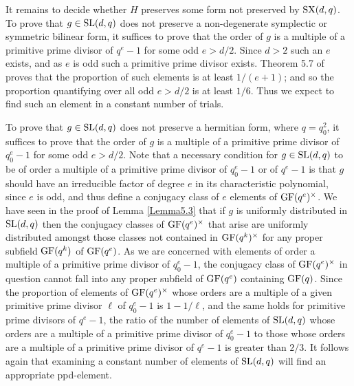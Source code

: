 \documentclass[12pt]{article}
\def\SL{{\rm SL}}
\def\GF{{\rm GF}}
\def\SX{{\rm SX}}
\begin{document}
It remains to decide whether $H$ preserves some form not preserved 
by $\SX(d,q)$.  
To prove that $g\in \SL(d,q)$ does not preserve a non-degenerate symplectic or
symmetric bilinear form, it suffices to prove that the order of $g$ is a multiple
of a primitive prime divisor of $q^e-1$ for some odd $e>d/2$.  Since $d>2$ such an
$e$ exists, and as $e$ is odd such a primitive prime divisor exists.  
Theorem 5.7 of \cite{NP} proves that 
the proportion of such elements is at least $1/(e+1)$; and so the
proportion quantifying over all odd $e>d/2$ is at least $1/6$. 
Thus we expect to find such an element in a constant number of trials.

To prove that $g\in\SL(d,q)$ does not preserve a hermitian form, where $q=q_0^2$, it
suffices to prove that the order of $g$ is a multiple of a primitive prime divisor of
$q_0^e-1$ for some odd $e>d/2$.  Note that a necessary condition for $g\in\SL(d,q)$ to
be of order a multiple of a primitive prime divisor of $q_0^e-1$ or of $q^e-1$ is that
$g$ should have an irreducible factor of degree $e$ in its characteristic polynomial,
since $e$ is odd, and thus define a conjugacy class of $e$ elements of $\GF(q^e)^\times$.
We have seen in the proof of Lemma \ref{Lemma5.3} that if $g$ is 
uniformly distributed in $\SL(d,q)$
then the conjugacy classes of $\GF(q^e)^\times$ that arise are uniformly distributed
amongst those classes not contained in $\GF(q^k)^\times$ for any proper subfield
$\GF(q^k)$ of $\GF(q^e)$.  As we are concerned with elements of order a multiple of a
primitive prime divisor of $q_0^e-1$, the conjugacy class of $\GF(q^e)^\times$ in
question cannot fall into any proper subfield of $\GF(q^e)$ containing $\GF(q)$.  
Since the proportion of elements of $\GF(q^e)^\times$ whose orders are a 
multiple of a given primitive
prime divisor $\ell$ of $q_0^e-1$ is $1-1/\ell$, and the same holds for primitive prime
divisors of $q^e-1$, the ratio of the number of elements of $\SL(d,q)$ whose orders are
a multiple of a primitive prime divisor of $q_0^e-1$ to those whose orders are a multiple
of a primitive prime divisor of $q^e-1$ is greater than $2/3$.  
It follows again that examining a constant
number of elements of $\SL(d,q)$ will find an appropriate ppd-element.
\end{document}
